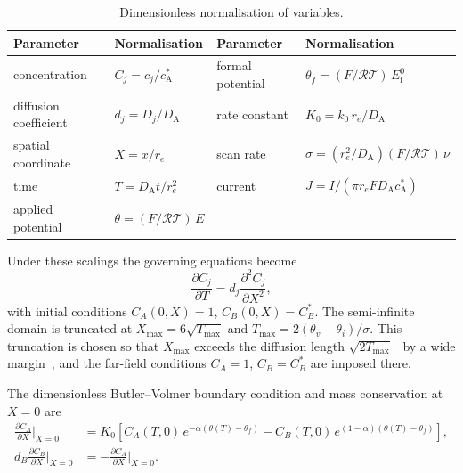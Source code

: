 \begin{table}[ht]
  \centering
  \begin{tabular*}{\textwidth}{@{\extracolsep{\fill}}llll@{}}
    \hline
    Parameter & Normalisation & Parameter & Normalisation \\
    \hline
    concentration & $C_j = c_j / c_{\mathrm{A}}^*$ & formal potential
    & $\theta_f = (F / \mathcal{R}\mathcal{T})\,E_{\mathrm{f}}^0$ \\
    diffusion coefficient & $d_j = D_j / D_{\mathrm{A}}$ & rate
    constant & $K_0 = k_0\,r_e / D_{\mathrm{A}}$ \\
    spatial coordinate & $X = x / r_e$ & scan rate & $\sigma = (r_e^2
    / D_{\mathrm{A}})(F / \mathcal{R}\mathcal{T})\,\nu$ \\
    time & $T = D_{\mathrm{A}} t / r_e^2$ & current & $J = I / (\pi
    r_e F D_{\mathrm{A}} c_{\mathrm{A}}^* )$ \\
    applied potential & $\theta = (F / \mathcal{R}\mathcal{T})\,E$ & & \\
    \hline
  \end{tabular*}
  \caption[Dimensionless normalisation of variables]{Dimensionless
  normalisation of variables.}
  \label{tab:normalisation}
\end{table}

Under these scalings the governing equations become
\begin{equation}
  \frac{\partial C_j}{\partial T} = d_j \frac{\partial^2 C_j}{\partial X^2},
  \label{eq:nd_diffusion}
\end{equation}
with initial conditions $C_A(0, X) = 1$, $C_B(0, X) = C_B^*$.
The
semi-infinite domain is truncated at $X_{\max} =
6\sqrt{T_{\mathrm{max}}}$ and $T_{\mathrm{max}} = 2(\theta_v -
\theta_i)/\sigma$. This truncation is  chosen so that
$X_{\max}$ exceeds the diffusion length
$\sqrt{2T_{\mathrm{max}}}$~\cite{einstein1905brownian} by a wide
margin~\cite{svir2003solution},
and the far-field conditions $C_A = 1$, $C_B = C_B^*$ are imposed there.

The dimensionless Butler--Volmer boundary condition and mass conservation
at $X = 0$ are
\begin{equation}
  \begin{aligned}
    \frac{\partial C_A}{\partial X}\bigg|_{X=0} &=
    K_0 \left[ C_A(T,0)\, e^{-\alpha(\theta(T) - \theta_f)}
    - C_B(T,0)\, e^{(1-\alpha)(\theta(T) - \theta_f)} \right], \\
    d_B \frac{\partial C_B}{\partial X}\bigg|_{X=0} &=
    -\frac{\partial C_A}{\partial X}\bigg|_{X=0}.
  \end{aligned}
  \label{eq:nondim-electrode-boundary}
\end{equation}

